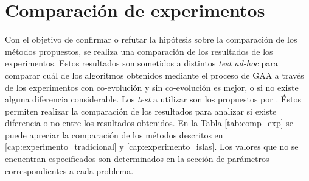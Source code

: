 \section{Comparación de experimentos}
Con el objetivo de confirmar o refutar la hipótesis sobre la comparación de los métodos propuestos, se realiza una comparación de los resultados de los experimentos. Estos resultados son sometidos a distintos \textit{test ad-hoc} para comparar cuál de los algoritmos obtenidos mediante el proceso de GAA a través de los experimentos con co-evolución y sin co-evolución es mejor, o si no existe alguna diferencia considerable. Los  \textit{test} a utilizar son los propuestos por \citep{derrac_2011}. Éstos permiten realizar la comparación de los resultados para analizar si existe diferencia o no entre los resultados obtenidos. En la Tabla \ref{tab:comp_exp} se puede apreciar la comparación de los métodos descritos en \ref{cap:experimento_tradicional} y \ref{cap:experimento_islas}. Los valores que no se encuentran especificados son determinados en la sección de parámetros correspondientes a cada problema.


